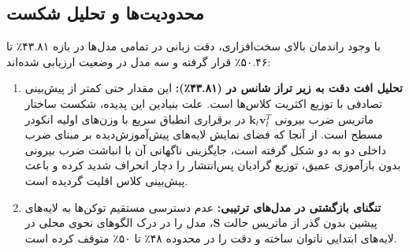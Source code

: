 \subsection{محدودیت‌ها و تحلیل شکست}
با وجود راندمان بالای سخت‌افزاری، دقت زبانی در تمامی مدل‌ها در بازه ۴۳.۸۱٪ تا ۵۰.۴۶٪ قرار گرفته و سه مدل در وضعیت  ارزیابی شده‌اند:
\begin{enumerate}
    \item \textbf{تحلیل افت دقت به زیر تراز شانس در  (۴۳.۸۱٪):} این مقدار حتی کمتر از پیش‌بینی تصادفی با توزیع اکثریت کلاس‌ها است. علت بنیادین این پدیده، شکست ساختار ماتریس ضرب بیرونی $\mathbf{k}_t \mathbf{v}_t^T$ در برقراری انطباق سریع با وزن‌های اولیه انکودر مسطح است. از آنجا که فضای نمایش لایه‌های پیش‌آموزش‌دیده  بر مبنای ضرب داخلی دو به دو شکل گرفته است، جایگزینی ناگهانی آن با انباشت ضرب بیرونی بدون بازآموزی عمیق، توزیع گرادیان پس‌انتشار را دچار انحراف شدید کرده و باعث پیش‌بینی کلاس اقلیت گردیده است.
    \item \textbf{تنگنای بازگشتی در مدل‌های ترتیبی:} عدم دسترسی مستقیم توکن‌ها به لایه‌های پیشین بدون گذر از ماتریس حالت $\mathbf{S}$، مدل را در درک الگوهای نحوی محلی در لایه‌های ابتدایی ناتوان ساخته و دقت را در محدوده ۴۸٪ تا ۵۰٪ متوقف کرده است.
\end{enumerate}

